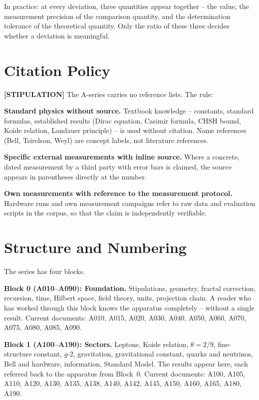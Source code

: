 In practice: at every deviation, three quantities appear together -- the
value, the measurement precision of the comparison quantity, and the
determination tolerance of the theoretical quantity. Only the ratio of these
three decides whether a deviation is meaningful.

\section{Citation Policy}

\textbf{[STIPULATION]} The A-series carries no reference lists. The rule:

\textbf{Standard physics without source.} Textbook knowledge -- constants,
standard formulas, established results (Dirac equation, Casimir formula,
CHSH bound, Koide relation, Landauer principle) -- is used without citation.
Name references (Bell, Tsirelson, Weyl) are concept labels, not literature
references.

\textbf{Specific external measurements with inline source.} Where a concrete,
dated measurement by a third party with error bars is claimed, the source
appears in parentheses directly at the number.

\textbf{Own measurements with reference to the measurement protocol.}
Hardware runs and own measurement campaigns refer to raw data and evaluation
scripts in the corpus, so that the claim is independently verifiable.

\section{Structure and Numbering}

The series has four blocks.

\textbf{Block 0 (A010--A090): Foundation.} Stipulations, geometry, fractal
correction, recursion, time, Hilbert space, field theory, units, projection
chain. A reader who has worked through this block knows the apparatus
completely -- without a single result. Current documents: A010, A015, A020,
A030, A040, A050, A060, A070, A075, A080, A085, A090.

\textbf{Block 1 (A100--A190): Sectors.} Leptons, Koide relation,
$\theta = 2/9$, fine-structure constant, $g$-2, gravitation, gravitational
constant, quarks and neutrinos, Bell and hardware, information, Standard
Model. The results appear here, each referred back to the apparatus from
Block~0. Current documents: A100, A105, A110, A120, A130, A135, A138, A140,
A142, A145, A150, A160, A165, A180, A190.

